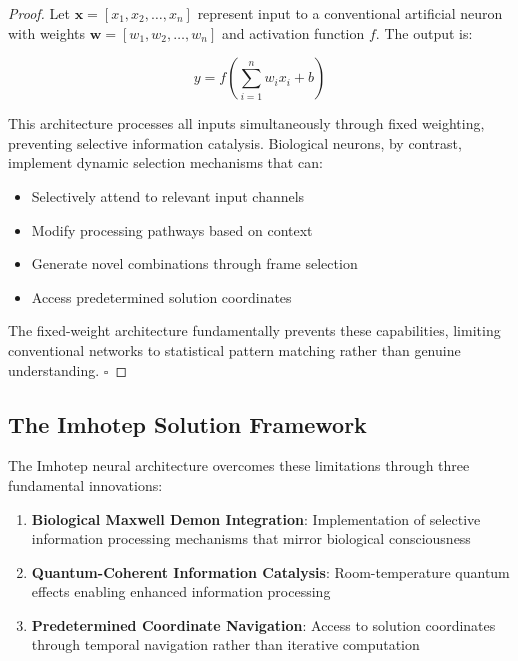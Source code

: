 \documentclass[12pt,a4paper]{article}
\theoremstyle{remark}
\begin{document}
\begin{proof}
Let $\mathbf{x} = [x_1, x_2, \ldots, x_n]$ represent input to a conventional artificial neuron with weights $\mathbf{w} = [w_1, w_2, \ldots, w_n]$ and activation function $f$. The output is:

\begin{equation}
y = f\left(\sum_{i=1}^{n} w_i x_i + b\right)
\end{equation}

This architecture processes all inputs simultaneously through fixed weighting, preventing selective information catalysis. Biological neurons, by contrast, implement dynamic selection mechanisms that can:

\begin{itemize}
\item Selectively attend to relevant input channels
\item Modify processing pathways based on context
\item Generate novel combinations through frame selection
\item Access predetermined solution coordinates
\end{itemize}

The fixed-weight architecture fundamentally prevents these capabilities, limiting conventional networks to statistical pattern matching rather than genuine understanding. $\square$
\end{proof}

\subsection{The Imhotep Solution Framework}

The Imhotep neural architecture overcomes these limitations through three fundamental innovations:

\begin{enumerate}
\item \textbf{Biological Maxwell Demon Integration}: Implementation of selective information processing mechanisms that mirror biological consciousness
\item \textbf{Quantum-Coherent Information Catalysis}: Room-temperature quantum effects enabling enhanced information processing
\item \textbf{Predetermined Coordinate Navigation}: Access to solution coordinates through temporal navigation rather than iterative computation
\end{enumerate}
\end{document}
